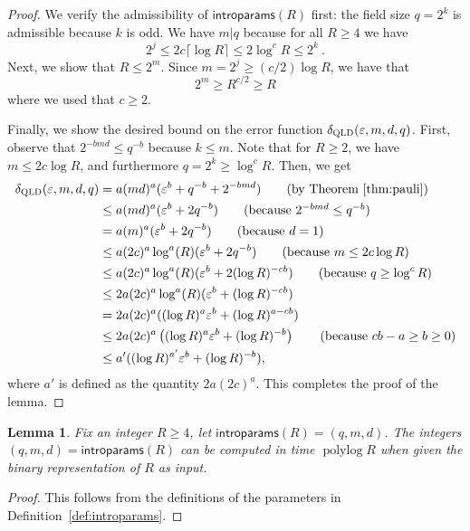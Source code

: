 \documentclass[11pt]{article}
\newtheorem{lemma}[theorem]{Lemma}
\theoremstyle{definition}
\newcommand{\eps}{\varepsilon}
\DeclareMathOperator{\polylog}{polylog}
\newcommand{\gamestyle}[1]{\ensuremath{\textsc{#1}}\xspace}
\newcommand{\qld}{\gamestyle{QLD}}
\newcommand{\introparams}{\mathsf{introparams}}
\begin{document}
\begin{proof}
  We verify the admissibility of $\introparams(R)$ first: the field size $q =
  2^k$ is admissible because $k$ is odd. We have $m | q$ because for all $R \geq 4$ we have  
  \[
  	2^j \leq 2 c \lceil \log R \rceil \leq 2 \log^c R \leq 2^k~.
  \]
	Next, we show that $R \leq 2^m$. Since $m = 2^j \geq (c/2) \log R$, we have that
	\[
		2^m \geq R^{c/2} \geq R
	\]
	where we used that $c \geq 2$. 

Finally, we show the desired bound on the error function $\delta_\qld(\eps,m,d,q)$. First, observe that $2^{-bmd} \leq q^{-b}$ because $k \leq m$.
  Note that for $R \geq 2$, we have $m \leq 2c \log R$, and furthermore $q =
  2^k \geq \log^c R$.
Then, we get
\begin{align*}
  	\delta_\qld(\eps,m,d,q)
    & = a (md)^a (\eps^b + q^{-b} + 2^{-bmd}) \tag{by Theorem~\ref{thm:pauli}}  \\
    & \leq a (md)^a (\eps^b + 2q^{-b}) \tag{because  $2^{-bmd} \leq q^{-b}$}  \\
    & = a (m)^a (\eps^b + 2q^{-b}) \tag{because  $d=1$}  \\
    & \leq a (2c)^a \log^{a} (R) ( \eps^{b} + 2q^{-b}) \tag{because  $m \leq 2c \log R$}\\
    & \leq a (2c)^a \log^{a} (R) ( \eps^{b} + 2(\log R)^{-cb}) \tag{because  $q \geq \log^c R$}\\
    & \leq 2a (2c)^a \log^{a} (R) ( \eps^{b} + (\log R)^{-cb}) \\
    & = 2a (2c)^a ( (\log R)^{a}\eps^{b} + (\log R)^{a-cb}) \\
    & \leq 2a(2c)^{a} \left ( (\log R)^{a} \eps^{b}
      + (\log R)^{-b} \right) \tag{because  $cb - a \geq b \geq 0$}\\
    & \leq a' ( (\log R)^{a'} \eps^{b} + (\log R)^{-b}),
  \end{align*}
  where $a'$ is defined as the quantity $2a(2c)^a$.
This completes the proof of the lemma.
\end{proof}

\begin{lemma}
	\label{lem:introparams-complexity}
	Fix an integer $R \geq 4$, let $\introparams(R) = (q,m,d)$.
	The integers $(q,m,d) = \introparams(R)$ can be computed in time $\polylog
  R$ when given the binary representation of $R$ as input.
\end{lemma}
\begin{proof}
  This follows from the definitions of the parameters in
  Definition~\ref{def:introparams}.
  
\end{proof}
\end{document}
